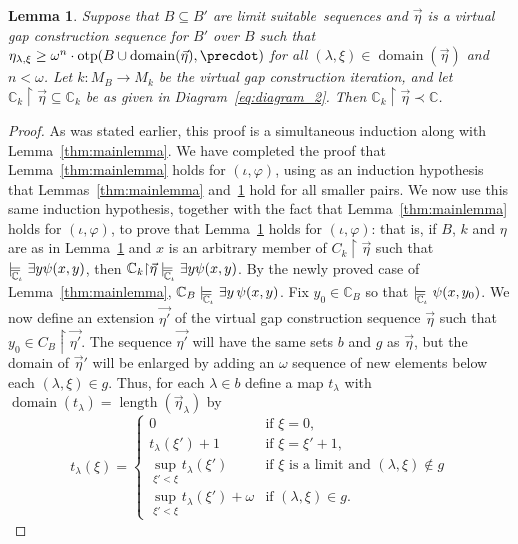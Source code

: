 \documentclass[
twoside,
]{article}
\newtheorem{lemma}[theorem]{Lemma}
\theoremstyle{definition}
\theoremstyle{remark}
\newcommand{\vg}{virtual gap construction}
\newcommand{\etarestrict}{\restrict}
\newcommand{\modelsCi}{\models_{\!\!\!\!\!\lower.7ex\hbox{$\scriptstyle\chang_\iota$}}}\newcommand{\fvia}[4]{f^{#1}_{#2(#3)#4}}
\newcommand{\xre}{\etarestrict\vec\eta{}}
\newcommand{\xrep}{\etarestrict\vetap}
\newcommand{\vetap}{\vec{\eta'}}
\newcommand{\LS}{limit suitable}
\DeclareMathOperator{\otp}{otp}
\renewcommand{\phi}{\varphi}
\DeclareMathOperator{\len}{length}
\newcommand{\restrict}{{\upharpoonright}}
\DeclareMathOperator{\domain}{domain}
\newcommand\chang{\mathbb{C}}
\begin{document}
\begin{lemma}\label{thm:mainlemma2}
  Suppose that $B\subseteq B'$ are \LS\ sequences and $\vec \eta$ is a virtual gap
  construction sequence for $B'$ over $B$ such that
  $\eta_{\lambda,\xi}\geq\omega^{n}\cdot\otp(B\cup\domain(\vec\eta),
  \precdot)$ for all $(\lambda,\xi)\in\domain(\vec\eta)$ and $n<\omega$.
  Let $k\colon M_B\to  M_k$ be 
  the  \vg{} iteration, and    let $\chang_k\xre\subseteq 
  \chang_k$ be as given in Diagram~\eqref{eq:diagram_2}.
  Then $\chang_{k}\xre\prec \chang$.
\end{lemma}

\begin{proof}
  As was stated earlier, this proof is a simultaneous induction along with 
  Lemma~\ref{thm:mainlemma}.     We have completed
  the proof that Lemma~\ref{thm:mainlemma} holds
  for $(\iota,\phi)$, using as an induction hypothesis that Lemmas~\ref{thm:mainlemma} and~\ref{thm:mainlemma2} hold for all smaller pairs.
  We now use this same induction hypothesis, together
  with the fact that Lemma~\ref{thm:mainlemma} holds for $(\iota,\phi)$,  to prove that Lemma~\ref{thm:mainlemma2} holds
  for  $(\iota,\phi)$: that is, if
  $B$, $k$  and $\eta$ are as in Lemma~\ref{thm:mainlemma2}
  and $x$ is an arbitrary member of
  $C_{k}\xre$ such that $\modelsCi\exists y\psi(x,y)$, then $\chang_k\xre\modelsCi\exists y\psi(x,y)$.   
  By the newly proved case of  Lemma~\ref{thm:mainlemma},
  $\chang_{B}\modelsCi\exists y\,\psi(x,y)$. 
  Fix $y_0\in\chang_{B}$ so that $ \modelsCi\psi(x,y_0)$.
  We now define an extension $\vetap$ of the \vg{} sequence
  $\vec \eta$ such that $y_0\in C_{B}\xrep$.
  The sequence $\vetap$ will have the same sets $b$
  and $g$ as $\vec\eta$, but the domain    of $\vec \eta'$ will be enlarged
  by adding an $\omega$ sequence of new elements below each $(\lambda,\xi)\in g$.
  Thus, for each $\lambda\in b$ define a map $t_{\lambda}$ with
  $\domain(t_{\lambda})=\len(\vec\eta_\lambda)$  by 
  \begin{equation*}
    t_{\lambda}(\xi) =
    \begin{cases}
      0&\text{if $\xi=0$,}\\
      t_{\lambda}(\xi')+1&\text{if $\xi=\xi'+1$,}\\
      \sup_{\xi'<\xi}t_{\lambda}(\xi')&\text{if $\xi$ is a limit and
        $(\lambda,\xi)\notin g$}\\
      \sup_{\xi'<\xi}t_{\lambda}(\xi')+\omega&\text{if     $(\lambda,\xi)\in g$}.
    \end{cases}
  \end{equation*}

\end{proof}
\end{document}

